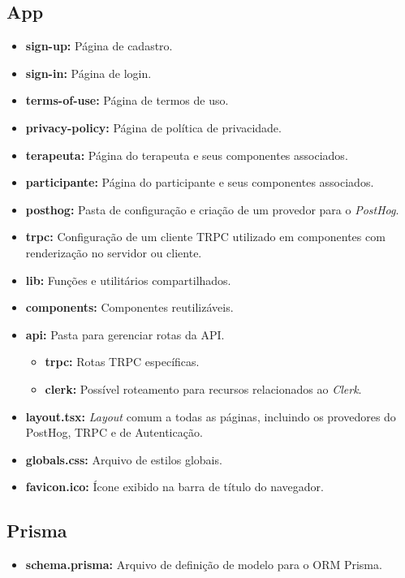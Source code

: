 \subsection{App}
\label{app}
\begin{itemize}
\item \textbf{sign-up:} Página de cadastro.
\item \textbf{sign-in:} Página de login.
\item \textbf{terms-of-use:} Página de termos de uso.
\item \textbf{privacy-policy:} Página de política de privacidade.
\item \textbf{terapeuta:} Página do terapeuta e seus componentes associados.
\item \textbf{participante:} Página do participante e seus componentes associados.
\item \textbf{posthog:} Pasta de configuração e criação de um provedor para o \textit{PostHog}.
\item \textbf{trpc:} Configuração de um cliente TRPC utilizado em componentes com renderização no servidor ou cliente.
\item \textbf{lib:} Funções e utilitários compartilhados.
\item \textbf{components:} Componentes reutilizáveis.


\item \textbf{api:} Pasta para gerenciar rotas da API.
\begin{itemize}
\item \textbf{trpc:} Rotas TRPC específicas.
\item \textbf{clerk:} Possível roteamento para recursos relacionados ao \textit{Clerk}.
\end{itemize}

\item \textbf{layout.tsx:} \textit{Layout} comum a todas as páginas, incluindo os provedores do PostHog, TRPC e de Autenticação.
\item \textbf{globals.css:} Arquivo de estilos globais.
\item \textbf{favicon.ico:} Ícone exibido na barra de título do navegador.
\end{itemize}


\subsection{Prisma}
\label{prisma}
\begin{itemize}
\item \textbf{schema.prisma:} Arquivo de definição de modelo para o ORM Prisma.
\end{itemize}

